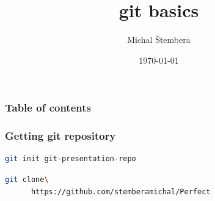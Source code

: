 \documentclass[hyperref={pdfpagelabels=false}]{beamer}
\title{git basics}
\author{Michal \v Stembera}
\date{\today}
\begin{document}
\begin{frame}
	\titlepage
\end{frame} 

\begin{frame}
\frametitle{Table of contents}
\tableofcontents
\end{frame} 

\begin{frame}[fragile]
\frametitle{Getting git repository}
	\begin{lstlisting}[language=bash, caption={Creating new repository}]
	git init git-presentation-repo
	\end{lstlisting}

	\begin{lstlisting}[language=bash, caption={Clone remote repository}]
	git clone\
	  https://github.com/stemberamichal/Perfect
	\end{lstlisting}
\end{frame} 
\end{document}
